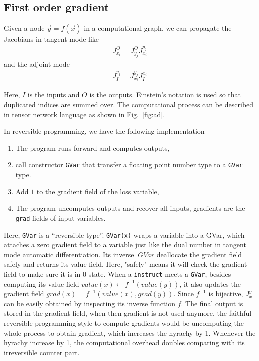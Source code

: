 \documentclass{article}
\newcommand{\<}{\langle}
\renewcommand{\>}{\rangle}
\newcommand{\out}{{O}}
\newcommand{\inp}{{I}}
\newcommand{\vx}{{x}}
\newcommand{\vy}{{y}}
\newcommand{\Fig}[1]{Fig.~\ref{#1}}
\begin{document}
\subsection{First order gradient}\label{sec:jacobian}
Given a node $\vec y = f(\vec x)$ in a computational graph, we can propagate the Jacobians in tangent mode like
\begin{align}
    J^\out_{x_i} = J^\out_{y_j} J^{y_j}_{x_i}
\end{align}
and the adjoint mode
\begin{align}
    J^{y_j}_\inp = J^{y_j}_{x_i} J_\inp^{x_i}
\end{align}

Here, $\inp$ is the inputs and $\out$ is the outputs.
Einstein's notation is used so that duplicated indices are summed over.
The computational process can be described in tensor network language as shown in \Fig{fig:ad}.

In reversible programming, we have the following implementation
\begin{enumerate}
    \item The program runs forward and computes outputs,
    \item call constructor \texttt{GVar} that transfer a floating point number type to a \texttt{GVar} type.
    \item Add $1$ to the gradient field of the loss variable,
    \item The program uncomputes outputs and recover all inputs, gradients are the \texttt{grad} fields of input variables.
\end{enumerate}

Here, \texttt{GVar} is a ``reversible type''. \texttt{GVar(x)} wraps a variable into a GVar, which attaches a zero gradient field to a variable just like the dual number in tangent mode automatic differentiation. Its inverse $~GVar$ deallocate the gradient field safely and returns its value field. Here, "safely" means it will check the gradient field to make sure it is in $0$ state.
When a \texttt{instruct} meets a \texttt{GVar}, besides computing its value field $value(\vx) \leftarrow f^{-1}(value(\vy))$, it also updates the gradient field $grad(\vx) = f^{-1}(value(\vx), grad(\vy))$. Since $f^{-1}$ is bijective, $J^\vy_\vx$ can be easily obtained by inspecting its inverse function $f$.
The final output is stored in the gradient field, when then gradient is not used anymore, the faithful reversible programming style to compute gradients would be uncomputing the whole process to obtain gradient, which increases the hyrachy by 1. Whenever the hyrachy increase by 1, the computational overhead doubles comparing with its irreversible counter part.
\end{document}
